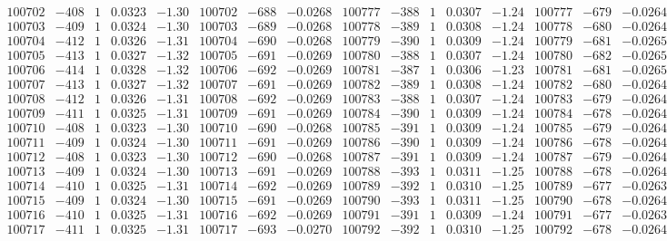 \documentclass[11pt,reqno,a4letter]{article}
\numberwithin{figure}{section}
\numberwithin{table}{section}
\theoremstyle{plain}
\numberwithin{theorem}{section}
\theoremstyle{definition}
\begin{document}
\begin{table}[ht!]
\begin{equation*}
{\begin{array}{ccccc|ccc||ccccc|ccc}
100702 & -408 & 1 & 0.0323 & -1.30 & 100702 & -688 & -0.0268 & 100777 & -388 & 1 & 0.0307 & -1.24 & 100777 & -679 & -0.0264  \\
100703 & -409 & 1 & 0.0324 & -1.30 & 100703 & -689 & -0.0268 & 100778 & -389 & 1 & 0.0308 & -1.24 & 100778 & -680 & -0.0264  \\
100704 & -412 & 1 & 0.0326 & -1.31 & 100704 & -690 & -0.0268 & 100779 & -390 & 1 & 0.0309 & -1.24 & 100779 & -681 & -0.0265  \\
100705 & -413 & 1 & 0.0327 & -1.32 & 100705 & -691 & -0.0269 & 100780 & -388 & 1 & 0.0307 & -1.24 & 100780 & -682 & -0.0265  \\
100706 & -414 & 1 & 0.0328 & -1.32 & 100706 & -692 & -0.0269 & 100781 & -387 & 1 & 0.0306 & -1.23 & 100781 & -681 & -0.0265  \\
100707 & -413 & 1 & 0.0327 & -1.32 & 100707 & -691 & -0.0269 & 100782 & -389 & 1 & 0.0308 & -1.24 & 100782 & -680 & -0.0264  \\
100708 & -412 & 1 & 0.0326 & -1.31 & 100708 & -692 & -0.0269 & 100783 & -388 & 1 & 0.0307 & -1.24 & 100783 & -679 & -0.0264  \\
100709 & -411 & 1 & 0.0325 & -1.31 & 100709 & -691 & -0.0269 & 100784 & -390 & 1 & 0.0309 & -1.24 & 100784 & -678 & -0.0264  \\
100710 & -408 & 1 & 0.0323 & -1.30 & 100710 & -690 & -0.0268 & 100785 & -391 & 1 & 0.0309 & -1.24 & 100785 & -679 & -0.0264  \\
100711 & -409 & 1 & 0.0324 & -1.30 & 100711 & -691 & -0.0269 & 100786 & -390 & 1 & 0.0309 & -1.24 & 100786 & -678 & -0.0264  \\
100712 & -408 & 1 & 0.0323 & -1.30 & 100712 & -690 & -0.0268 & 100787 & -391 & 1 & 0.0309 & -1.24 & 100787 & -679 & -0.0264  \\
100713 & -409 & 1 & 0.0324 & -1.30 & 100713 & -691 & -0.0269 & 100788 & -393 & 1 & 0.0311 & -1.25 & 100788 & -678 & -0.0264  \\
100714 & -410 & 1 & 0.0325 & -1.31 & 100714 & -692 & -0.0269 & 100789 & -392 & 1 & 0.0310 & -1.25 & 100789 & -677 & -0.0263  \\
100715 & -409 & 1 & 0.0324 & -1.30 & 100715 & -691 & -0.0269 & 100790 & -393 & 1 & 0.0311 & -1.25 & 100790 & -678 & -0.0264  \\
100716 & -410 & 1 & 0.0325 & -1.31 & 100716 & -692 & -0.0269 & 100791 & -391 & 1 & 0.0309 & -1.24 & 100791 & -677 & -0.0263  \\
100717 & -411 & 1 & 0.0325 & -1.31 & 100717 & -693 & -0.0270 & 100792 & -392 & 1 & 0.0310 & -1.25 & 100792 & -678 & -0.0264  \\

\end{array}}
\end{equation*}
\end{table}
\end{document}

